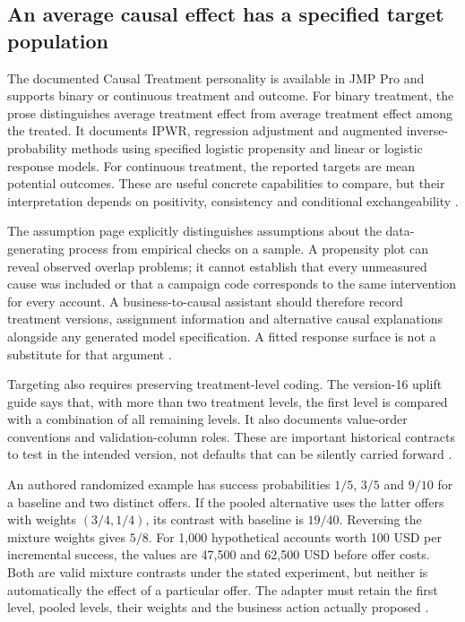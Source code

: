 \subsection{An average causal effect has a specified target population}
The documented Causal Treatment personality is available in JMP Pro and
supports binary or continuous treatment and outcome. For binary treatment,
the prose distinguishes average treatment effect from average treatment
effect among the treated. It documents IPWR, regression adjustment and
augmented inverse-probability methods using specified logistic propensity
and linear or logistic response models. For continuous treatment, the
reported targets are mean potential outcomes. These are useful concrete
capabilities to compare, but their interpretation depends on positivity,
consistency and conditional exchangeability
\cite{exec13_ch_jmp_causal}.

The assumption page explicitly distinguishes assumptions about the
data-generating process from empirical checks on a sample. A propensity
plot can reveal observed overlap problems; it cannot establish that every
unmeasured cause was included or that a campaign code corresponds to the
same intervention for every account. A business-to-causal assistant should
therefore record treatment versions, assignment information and alternative
causal explanations alongside any generated model specification. A fitted
response surface is not a substitute for that argument
\cite{exec13_ch_jmp_causal,exec24_jmp_choice}.

Targeting also requires preserving treatment-level coding. The version-16
uplift guide says that, with more than two treatment levels, the first
level is compared with a combination of all remaining levels. It also
documents value-order conventions and validation-column roles. These are
important historical contracts to test in the intended version, not
defaults that can be silently carried forward
\cite{exec13_ch_jmp_uplift}.

An authored randomized example has success probabilities $1/5$, $3/5$
and $9/10$ for a baseline and two distinct offers. If the pooled alternative
uses the latter offers with weights $(3/4,1/4)$, its contrast with baseline
is $19/40$. Reversing the mixture weights gives $5/8$. For 1,000
hypothetical accounts worth 100 USD per incremental success, the values
are 47,500 and 62,500 USD before offer costs. Both are valid mixture
contrasts under the stated experiment, but neither is automatically the
effect of a particular offer. The adapter must retain the first level,
pooled levels, their weights and the business action actually proposed
\cite{exec24_jmp_choice}.

